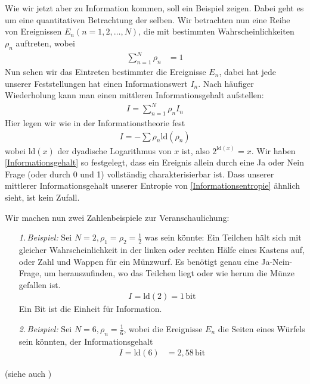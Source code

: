 \documentclass[ngerman]{scrartcl}
\begin{document}
Wie wir jetzt aber zu Information kommen, soll ein Beispiel zeigen. Dabei geht es um eine quantitativen Betrachtung der selben.
Wir betrachten nun eine Reihe von Ereignissen $E_n (n = 1, 2, \ldots, N)$, die mit bestimmten Wahrscheinlichkeiten $\rho_n$ auftreten, wobei
	\begin{align*}
		\sum_{n=1}^N \rho_n &= 1
	\end{align*}
Nun sehen wir das Eintreten bestimmter die Ereignisse $E_n$, dabei hat jede unserer Feststellungen hat einen Informationswert $I_n$. Nach häufiger Wiederholung kann man einen mittleren Informationsgehalt aufstellen:
	\begin{align*}
		I = \sum_{n=1}^N \rho_n I_n
	\end{align*}
Hier legen wir wie in der Informationstheorie fest
	\begin{align*} \label{Informationsgehalt}
		I = - \sum \rho_n \mathrm{ld}(\rho_n)
	\end{align*}
wobei $\mathrm{ld}(x)$ der dyadische Logarithmus von $x$ ist, also $2^{\mathrm{ld}(x)} = x$. 
Wir haben \eqref{Informationsgehalt} so festgelegt, dass ein Ereignis allein durch eine Ja oder Nein Frage (oder durch 0 und 1) vollständig charakterisierbar ist. 
Dass unserer mittlerer Informationsgehalt unserer Entropie von \eqref{Informationsentropie} ähnlich sieht, ist kein Zufall.

Wir machen nun zwei Zahlenbeispiele zur Veranschaulichung:
	\begin{itemize}
		\item[\textit{1.\,Beispiel:}] Sei $N=2, \rho_1 = \rho_2= \frac{1}{2}$ was sein könnte: Ein Teilchen hält sich mit gleicher Wahrscheinlichkeit in der linken oder rechten Hälfe eines Kastens auf, oder Zahl und Wappen für ein Münzwurf.
		Es benötigt genau eine Ja-Nein-Frage, um herauszufinden, wo das Teilchen liegt oder wie herum die Münze gefallen ist.
			\begin{align*}
				I = \mathrm{ld}(2) = 1 \,\mathrm{bit}
			\end{align*}
		Ein Bit ist die Einheit für Information.
		\item[\textit{2.\,Beispiel:}]Sei $N=6, \rho_n = \frac{1}{6}$, wobei die Ereignisse $E_n$ die Seiten eines Würfels sein könnten, der Informationsgehalt
			\begin{align*}
				I = \mathrm{ld}(6) &= 2,58 \,\mathrm{bit}
			\end{align*}
	\end{itemize}
(siehe auch \cite{Brenig})
\end{document}
